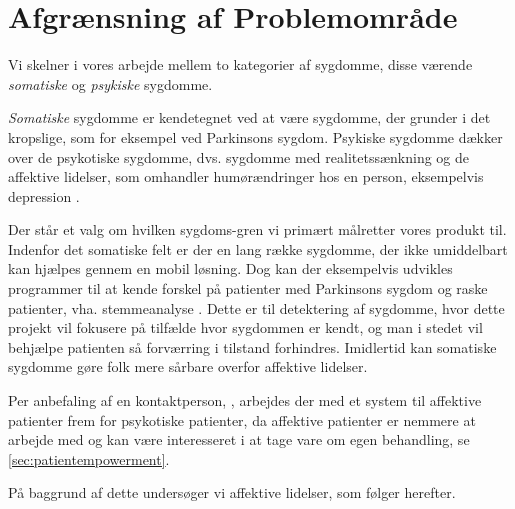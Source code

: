 \section{Afgrænsning af Problemområde}
Vi skelner i vores arbejde mellem to kategorier af sygdomme, disse værende \textit{somatiske} og \textit{psykiske} sygdomme.

\textit{Somatiske} sygdomme er kendetegnet ved at være sygdomme, der grunder i det kropslige, som for eksempel ved Parkinsons sygdom. 
Psykiske sygdomme dækker over de psykotiske sygdomme, dvs. sygdomme med realitetssænkning og de affektive lidelser, som omhandler humørændringer hos en person, eksempelvis depression \citep{misc:netpsykpsykose}.

Der står et valg om hvilken sygdoms-gren vi primært målretter vores produkt til.
Indenfor det somatiske felt er der en lang række sygdomme, der ikke umiddelbart kan hjælpes gennem en mobil løsning.
Dog kan der eksempelvis udvikles programmer til at kende forskel på patienter med Parkinsons sygdom og raske patienter, vha. stemmeanalyse \citep{6168572}.
Dette er til detektering af sygdomme, hvor dette projekt vil fokusere på tilfælde hvor sygdommen er kendt, og man i stedet vil behjælpe patienten så forværring i tilstand forhindres.
Imidlertid kan somatiske sygdomme gøre folk mere sårbare overfor affektive lidelser.

Per anbefaling af en kontaktperson, \citet{misc:janne-rasmussen}, arbejdes der med et system til affektive patienter frem for psykotiske patienter, da affektive patienter er nemmere at arbejde med og kan være interesseret i at tage vare om egen behandling, se \cref{sec:patientempowerment}.

På baggrund af dette undersøger vi affektive lidelser, som følger herefter.
